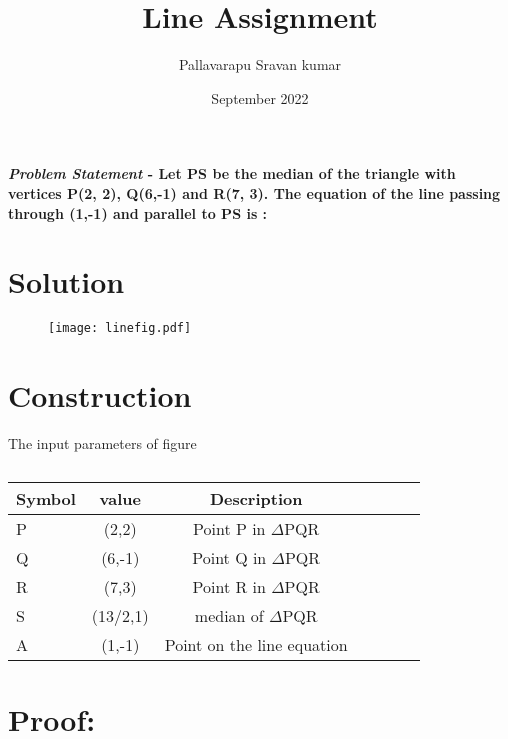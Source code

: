 \documentclass[journal,10pt,twocolumn]{article}
\title{\textbf{Line Assignment}}
\author{Pallavarapu Sravan kumar}
\date{September 2022}
\begin{document}
\maketitle
\paragraph{\textit{\large Problem Statement} - Let PS be the median of the triangle with vertices P(2, 2), Q(6,-1) and R(7, 3). The equation of the line passing through (1,-1) and parallel to PS is :}
\section*{\large Solution}
\begin{figure}[H]
\centering
\texttt{[image: linefig.pdf]}
\caption{}
\end{figure}

\section*{\large Construction}



The input parameters of figure 



\begin{table}[htbp]
 \begin{center}
    \begin{tabular}{|l|c|c|c|c|c|c} \hline \textbf{Symbol}
  & \textbf{value} & \textbf{Description} \\
 \hline
P &(2,2) & Point P in $\Delta$PQR\\ \hline
Q&(6,-1) & Point Q in $\Delta$PQR \\ \hline
R&(7,3)   & Point R in $\Delta$PQR\\ \hline
S&(13/2,1)   & median  of $\Delta$PQR\\ \hline
A&(1,-1)   & Point on the line equation\\ \hline
	
\end{tabular}   
\end{center}
\caption{\label{table:dummytable} }
\end{table}

\vspace*{10mm}


\section*{Proof:}
\end{document}
